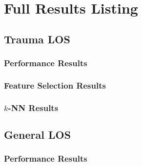 \chapter{Full Results Listing} \label{app:results}

\section{Trauma LOS}
\subsection{Performance Results}

















\clearpage
\subsection{Feature Selection Results}









\clearpage
\subsection{$k$-NN Results}





\clearpage
\section{General LOS}
\subsection{Performance Results}

